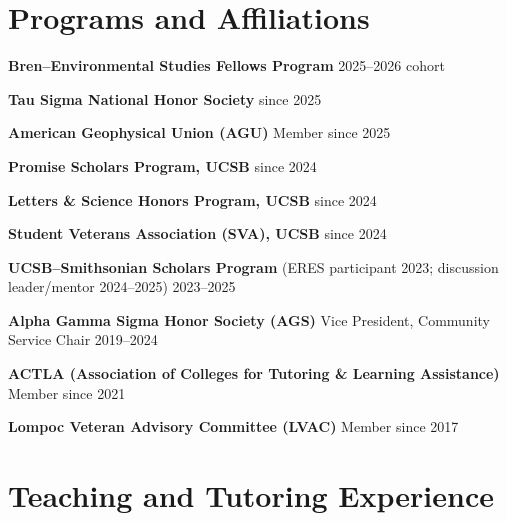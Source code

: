 \documentclass[letterpaper]{article}
\renewenvironment{itemize}{
  \begin{list}{}{
    \setlength{\leftmargin}{1.5em}
  }
}{
  \end{list}
}
\begin{document}
\section*{Programs and Affiliations}

\begin{itemize}
  \item \textbf{Bren–Environmental Studies Fellows Program} \hfill 2025--2026 cohort
  \item \textbf{Tau Sigma National Honor Society} \hfill since 2025
  \item \textbf{American Geophysical Union (AGU)} Member \hfill since 2025
  \item \textbf{Promise Scholars Program, UCSB} \hfill since 2024
  \item \textbf{Letters \& Science Honors Program, UCSB} \hfill since 2024
  \item \textbf{Student Veterans Association (SVA), UCSB} \hfill since 2024
  \item \textbf{UCSB–Smithsonian Scholars Program} (ERES participant 2023; discussion leader/mentor 2024--2025) \hfill 2023--2025
  \item \textbf{Alpha Gamma Sigma Honor Society (AGS)} Vice President, Community Service Chair \hfill 2019--2024
  \item \textbf{ACTLA (Association of Colleges for Tutoring \& Learning Assistance)} Member \hfill since 2021
  \item \textbf{Lompoc Veteran Advisory Committee (LVAC)} Member \hfill since 2017
\end{itemize}

\section*{Teaching and Tutoring Experience}
\end{document}
